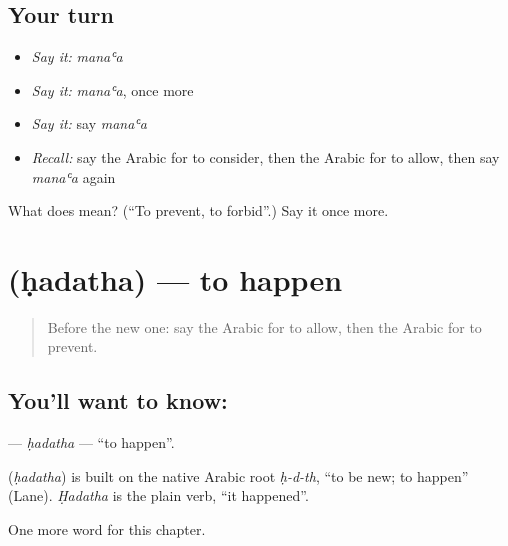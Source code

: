 \subsection*{Your turn}
\begin{itemize}
\raggedright
  \item \emph{Say it:} \emph{manaʿa}
  \item \emph{Say it:} \emph{manaʿa}, once more
  \item \emph{Say it:} say \emph{manaʿa}
  \item \emph{Recall:} say the Arabic for to consider, then the Arabic for to allow, then say \emph{manaʿa} again
\end{itemize}

\begin{tcolorbox}[breakable,colback=teal!4,colframe=teal!35!black,title={Before you move on}]
What does  mean? (\textquotedblleft{}To prevent, to forbid\textquotedblright{}.) Say it once more.
\end{tcolorbox}
\section[\texorpdfstring{\ar{حدث} (ḥadatha)}{حدث (ḥadatha)}]{ (ḥadatha) — to happen}

\label{lesson:AR-C198-hadatha}



\begin{quote}
Before the new one: say the Arabic for to allow, then the Arabic for to prevent.
\end{quote}

\subsection*{You'll want to know: }
\textbf{} — \emph{ḥadatha} — \textquotedblleft{}to happen\textquotedblright{}.

\begin{cousinweb}
\textbf{} (\emph{ḥadatha}) is built on the native Arabic root \emph{ḥ-d-th}, \textquotedblleft{}to be new; to happen\textquotedblright{} (Lane). \emph{Ḥadatha} is the plain verb, \textquotedblleft{}it happened\textquotedblright{}.
\end{cousinweb}

\begin{grammarlens}[title={What you've built}]
One more word for this chapter.
\end{grammarlens}

